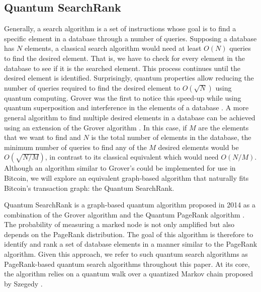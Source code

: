 \documentclass[nofootinbib,aps,prd,reprint,superscriptaddress,floatfix]{revtex4-2}
\begin{document}
\subsection{Quantum SearchRank}\label{subsec:Quantum_SearchRank}
 
Generally, a search algorithm is a set of instructions whose goal is to find a specific element in a database through a number of queries. Supposing a database has $N$ elements, a classical search algorithm would need at least $O(N)$ queries to find the desired element. That is, we have to check for every element in the database to see if it is the searched element. This process continues until the desired element is identified. Surprisingly, quantum properties allow reducing the number of queries required to find the desired element to $O(\sqrt{N})$ using quantum computing. Grover was the first to notice this speed-up while using quantum superposition and interference in the elements of a database \cite{Grover}. A more general algorithm to find multiple desired elements in a database can be achieved using an extension of the Grover algorithm \cite{Portugal, Grover_M}. In this case, if $M$ are the elements that we want to find and $N$ is the total number of elements in the database, the minimum number of queries to find any of the $M$ desired elements would be $O(\sqrt{N/M})$, in contrast to its classical equivalent which would need $O({N/M})$. Although an algorithm similar to Grover's could be implemented for use in Bitcoin, we will explore an equivalent graph-based algorithm that naturally fits Bitcoin's transaction graph: the Quantum SearchRank.

Quantum SearchRank is a graph-based quantum algorithm proposed in 2014 \cite{Searchrank} as a combination of the Grover algorithm and the Quantum PageRank algorithm \cite{Paparo1,Paparo2,APR}. The probability of measuring a marked node is not only amplified but also depends on the PageRank distribution. The goal of this algorithm is therefore to identify and rank a set of database elements in a manner similar to the PageRank algorithm. Given this approach, we refer to such quantum search algorithms as PageRank-based quantum search algorithms throughout this paper. At its core, the algorithm relies on a quantum walk over a quantized Markov chain proposed by Szegedy \cite{Szegedy}. 
\end{document}
